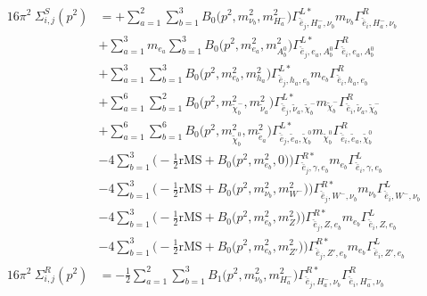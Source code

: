 \begin{itemize}
\begin{align} 
16\pi^2 \ \Sigma^S_{i,j}(p^2) &= +\sum_{a=1}^{2}\sum_{b=1}^{3}{B_0\Big(p^{2},m^2_{\nu_{{b}}},m^2_{H^-_{{a}}}\Big)} {\Gamma^{L*}_{\check{\bar{e}}_{{j}},H^-_{{a}},\nu_{{b}}}} m_{\nu_{{b}}} {\Gamma^R_{\check{\bar{e}}_{{i}},H^-_{{a}},\nu_{{b}}}} \nonumber \\ 
 &+\sum_{a=1}^{3}m_{e_{{a}}} \sum_{b=1}^{3}{B_0\Big(p^{2},m^2_{e_{{a}}},m^2_{A^0_{{b}}}\Big)} {\Gamma^{L*}_{\check{\bar{e}}_{{j}},e_{{a}},A^0_{{b}}}} {\Gamma^R_{\check{\bar{e}}_{{i}},e_{{a}},A^0_{{b}}}}  \nonumber \\ 
 &+\sum_{a=1}^{3}\sum_{b=1}^{3}{B_0\Big(p^{2},m^2_{e_{{b}}},m^2_{h_{{a}}}\Big)} {\Gamma^{L*}_{\check{\bar{e}}_{{j}},h_{{a}},e_{{b}}}} m_{e_{{b}}} {\Gamma^R_{\check{\bar{e}}_{{i}},h_{{a}},e_{{b}}}} \nonumber \\ 
 &+\sum_{a=1}^{6}\sum_{b=1}^{2}{B_0\Big(p^{2},m^2_{\tilde{\chi}^-_{{b}}},m^2_{\tilde{\nu}_{{a}}}\Big)} {\Gamma^{L*}_{\check{\bar{e}}_{{j}},\tilde{\nu}_{{a}},\tilde{\chi}^-_{{b}}}} m_{\tilde{\chi}^-_{{b}}} {\Gamma^R_{\check{\bar{e}}_{{i}},\tilde{\nu}_{{a}},\tilde{\chi}^-_{{b}}}} \nonumber \\ 
 &+\sum_{a=1}^{6}\sum_{b=1}^{6}{B_0\Big(p^{2},m^2_{\tilde{\chi}^0_{{b}}},m^2_{\tilde{e}_{{a}}}\Big)} {\Gamma^{L*}_{\check{\bar{e}}_{{j}},\tilde{e}_{{a}},\tilde{\chi}^0_{{b}}}} m_{\tilde{\chi}^0_{{b}}} {\Gamma^R_{\check{\bar{e}}_{{i}},\tilde{e}_{{a}},\tilde{\chi}^0_{{b}}}} \nonumber \\ 
 &-4 \sum_{b=1}^{3}\Big(-\frac{1}{2} \text{rMS}  + {B_0\Big(p^{2},m^2_{e_{{b}}},0\Big)}\Big){\Gamma^{R*}_{\check{\bar{e}}_{{j}},\gamma,e_{{b}}}} m_{e_{{b}}} {\Gamma^L_{\check{\bar{e}}_{{i}},\gamma,e_{{b}}}}  \nonumber \\ 
 &-4 \sum_{b=1}^{3}\Big(-\frac{1}{2} \text{rMS}  + {B_0\Big(p^{2},m^2_{\nu_{{b}}},m^2_{W^-}\Big)}\Big){\Gamma^{R*}_{\check{\bar{e}}_{{j}},W^-,\nu_{{b}}}} m_{\nu_{{b}}} {\Gamma^L_{\check{\bar{e}}_{{i}},W^-,\nu_{{b}}}}  \nonumber \\ 
 &-4 \sum_{b=1}^{3}\Big(-\frac{1}{2} \text{rMS}  + {B_0\Big(p^{2},m^2_{e_{{b}}},m^2_{Z}\Big)}\Big){\Gamma^{R*}_{\check{\bar{e}}_{{j}},Z,e_{{b}}}} m_{e_{{b}}} {\Gamma^L_{\check{\bar{e}}_{{i}},Z,e_{{b}}}}  \nonumber \\ 
 &-4 \sum_{b=1}^{3}\Big(-\frac{1}{2} \text{rMS}  + {B_0\Big(p^{2},m^2_{e_{{b}}},m^2_{{Z'}}\Big)}\Big){\Gamma^{R*}_{\check{\bar{e}}_{{j}},{Z'},e_{{b}}}} m_{e_{{b}}} {\Gamma^L_{\check{\bar{e}}_{{i}},{Z'},e_{{b}}}}  \\ 
16\pi^2 \ \Sigma^R_{i,j}(p^2) &= -\frac{1}{2} \sum_{a=1}^{2}\sum_{b=1}^{3}{B_1\Big(p^{2},m^2_{\nu_{{b}}},m^2_{H^-_{{a}}}\Big)} {\Gamma^{R*}_{\check{\bar{e}}_{{j}},H^-_{{a}},\nu_{{b}}}} {\Gamma^R_{\check{\bar{e}}_{{i}},H^-_{{a}},\nu_{{b}}}}  \nonumber \\ 

\end{align}
\end{itemize}

